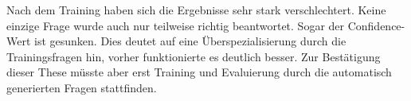 Nach dem Training haben sich die Ergebnisse sehr stark verschlechtert.
Keine einzige Frage wurde auch nur teilweise richtig beantwortet.
Sogar der Confidence-Wert ist gesunken.
Dies deutet auf eine Überspezialisierung durch die Trainingsfragen hin, vorher funktionierte es deutlich besser.
Zur Bestätigung dieser These müsste aber erst Training und Evaluierung durch die automatisch generierten Fragen stattfinden.
